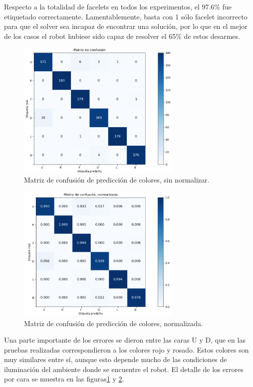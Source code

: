 Respecto a la totalidad de facelets en todos los experimentos, el 97.6\% fue etiquetado correctamente. Lamentablemente, basta con 1 sólo facelet incorrecto para que el solver sea incapaz de encontrar una solución, por lo que en el mejor de los casos el robot hubiese sido capaz de resolver el 65\% de estos desarmes.

\begin{figure}[h!]
	\centering
	\includegraphics[width=0.7\textwidth]{figures/conf_matrix}
	\caption{Matriz de confusión de predicción de colores, sin normalizar.}
	\label{confusion}
\end{figure}
\begin{figure}[h!]
	\centering
	\includegraphics[width=0.7\textwidth]{figures/conf_matrix_norm}
	\caption{Matriz de confusión de predicción de colores, normalizada.}
	\label{confusionnorm}
\end{figure}

Una parte importante de los errores se dieron entre las caras U y D, que en las pruebas realizadas correspondieron a los colores rojo y rosado. Estos colores son muy similares entre sí, aunque esto depende mucho de las condiciones de iluminación del ambiente donde se encuentre el robot. El detalle de los errores por cara se muestra en las figuras\ref{confusion} y \ref{confusionnorm}.



